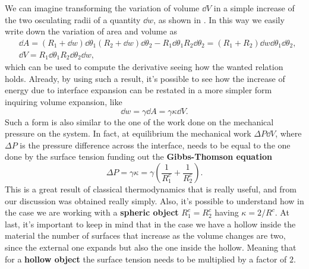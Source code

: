{
    We can imagine transforming the variation of volume $\dd V$ in a simple increase of the two osculating radii of a quantity $\dd w$, as shown in . In this way we easily write down the variation of area and volume as
    \begin{align}
        &\dd A = \left( R_1 + \dd w \right)\dd \theta_1\left( R_2 + \dd w \right)\dd \theta_2 - R_1\dd \theta_1 R_2\dd \theta_2 = \left( R_1 + R_2 \right)\dd w \dd \theta_1 \dd \theta_2,\\
        &\dd V = R_1\dd \theta_1 R_2 \dd \theta_2\dd w,
    \end{align}
    which can be used to compute the derivative seeing how the wanted relation holds.
}
\noindent
Already, by using such a result, it's possible to see how the increase of energy due to interface expansion can be restated in a more simpler form inquiring volume expansion, like
\begin{equation}
    \dd w = \gamma\dd A = \gamma\kappa\dd V.
\end{equation}
Such a form is also similar to the one of the work done on the mechanical pressure on the system. In fact, at equilibrium the mechanical work $\Delta P \dd V$, where $\Delta P $ is the pressure difference across the interface, needs to be equal to the one done by the surface tension funding out the \textbf{Gibbs-Thomson equation}
\begin{equation}
    \label{eq:Gibbs-Thom}
    \Delta P = \gamma\kappa = \gamma\left( \frac{1}{R_1^c} + \frac{1}{R_2^c} \right).
\end{equation}
This is a great result of classical thermodynamics that is really useful, and from our discussion was obtained really simply. Also, it's possible to understand how in the case we are working with a \textbf{spheric object} $R_1^c = R_2^c$ having $\kappa = 2/R^c$. At last, it's important to keep in mind that in the case we have a hollow inside the material the number of surfaces that increase as the volume changes are two, since the external one expands but also the one inside the hollow. Meaning that for a \textbf{hollow object} the surface tension needs to be multiplied by a factor of $2$.

